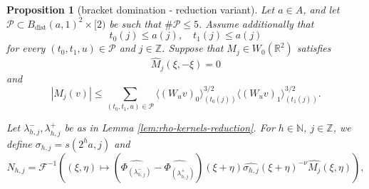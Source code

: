 \documentclass[12pt,reqno]{amsart}
\theoremstyle{plain}
\newtheorem{proposition}[theorem]{Proposition}
\numberwithin{equation}{section}
\theoremstyle{remark}
\newcommand{\using}[1]{}
\newcommand{\Z}{{\mathbb Z}}
\newcommand{\N}{{\mathbb N}}
\DeclareMathOperator{\dist}{dist}
\begin{document}
\begin{proposition}[bracket domination - reduction variant]
\label{lem:increase-data-bracket-domination}\using{lem:rho-kernels-reduction}\using{two bump estimate}\using{bump triangle}\using{orthogonal decay}\using{convolution vector}\using{lem:affine-diagonal-cancellation-reduction}\using{Properties of distance of sequences}\using{Operations on spaced sequences}
Let \(a\in A\), and let
$
\mathcal P\subset B_{\dist}(a,1)^2\times[2)$ be such that $\#\mathcal P\leq5$. Assume additionally that
\begin{equation}
    \label{E:increase-data-one-sided-scales}
    t_0(j)\leq a(j),
    \quad
    t_1(j)\leq a(j)
\end{equation}
for every \((t_0,t_1,u)\in\mathcal P\) and \(j\in\mathbb Z\).
Suppose that \(M_j\in W_0(\mathbb R^2)\) satisfies
\begin{equation}\label{auto:reduction-diagonal-cancellation}
\widehat M_j(\xi,-\xi)=0
\end{equation}
and
\begin{equation}\label{auto:reduction-kernel-decay}
|M_j(v)|
\leq
\sum_{(t_0,t_1,u)\in\mathcal P}
\langle(W_uv)_0\rangle_{(t_0(j))}^{3/2}
\langle(W_uv)_1\rangle_{(t_1(j))}^{3/2}.
\end{equation}

Let $\lambda_{h,j}^-,\lambda_{h,j}^+$ be as in Lemma \ref{lem:rho-kernels-reduction}.
For $h\in\N$, $j\in \Z$, we define
$
\sigma_{h,j} = s(2^{h} a,j)
$
and
\begin{equation}\label{auto:increase-data-N-kernel}
N_{h,j} =
\mathcal F^{-1}\left((\xi,\eta) \mapsto (\widehat{\Phi_{(\lambda_{h,j}^-)}}-\widehat{\Phi_{(\lambda_{h,j}^+)}})(\xi+\eta) \widehat{\sigma_{h,j}}(\xi+\eta)^{-\nu} \widehat{M_j}(\xi,\eta)\right),
\end{equation}



\end{proposition}
\end{document}
